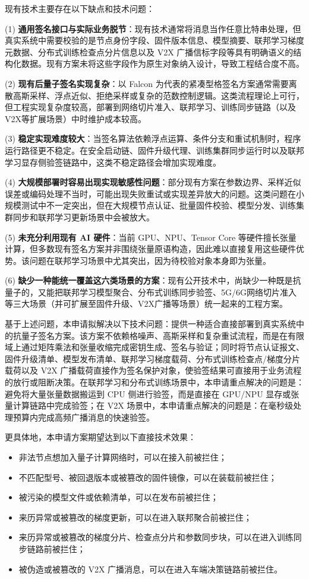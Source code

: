 \documentclass[12pt,a4paper]{article}
\begin{document}
现有技术主要存在以下缺点和技术问题：

(1) \textbf{通用签名接口与实际业务脱节}：现有技术通常将消息当作任意比特串处理，但真实系统中需要校验的是节点身份字段、固件版本信息、模型摘要、联邦学习梯度元数据、分布式训练检查点分片信息以及 V2X 广播信标字段等具有明确语义的结构化数据。现有方案未将这些字段作为原生对象纳入设计，导致工程结合度不高。

(2) \textbf{现有后量子签名实现复杂}：以 Falcon 为代表的紧凑型格签名方案通常需要离散高斯采样、浮点近似、拒绝采样或复杂的范数控制逻辑。这类流程理论上可行，但工程实现复杂度较高，部署到网络切片准入、联邦学习、训练同步链路（以及V2X等扩展场景）中时维护成本较高。

(3) \textbf{稳定实现难度较大}：当签名算法依赖浮点运算、条件分支和重试机制时，程序运行路径更不稳定。在安全启动链、固件升级代理、训练集群同步运行时以及联邦学习显存侧验签链路中，这类不稳定路径会增加实现难度。

(4) \textbf{大规模部署时容易出现实现敏感性问题}：部分现有方案在参数边界、采样近似误差或编码处理不当时，可能出现失败重试或实现差异放大的问题。这类问题在小规模测试中不一定突出，但在大规模节点认证、批量固件校验、模型分发、训练集群同步和联邦学习更新场景中会被放大。

(5) \textbf{未充分利用现有 AI 硬件}：当前 GPU、NPU、Tensor Core 等硬件擅长张量计算，但多数现有签名方案并非围绕张量原语构造，因此难以直接复用这些硬件优势。该问题在联邦学习场景中尤其突出，因为待校验对象本身即为张量。

(6) \textbf{缺少一种能统一覆盖这六类场景的方案}：现有公开技术中，尚缺少一种既是抗量子的，又能把联邦学习模型聚合、分布式训练同步验签、5G/6G网络切片准入等三大场景（并可扩展至固件升级、V2X广播等场景）统一起来的工程方案。

基于上述问题，本申请拟解决以下技术问题：提供一种适合直接部署到真实系统中的抗量子签名方案。该方案不依赖格噪声、高斯采样和复杂重试流程，而是在有限域上通过矩阵乘法和张量收缩完成密钥生成、签名与验证；同时将节点认证报文、固件升级清单、模型发布清单、联邦学习梯度载荷、分布式训练检查点/梯度分片载荷以及 V2X 广播载荷直接作为签名保护对象，使验签结果可直接用于业务流程的放行或阻断决策。在联邦学习和分布式训练场景中，本申请重点解决的问题是：避免将大量张量数据搬运到 CPU 侧进行验签，而是直接在 GPU/NPU 显存或张量计算链路中完成验签；在 V2X 场景中，本申请重点解决的问题是：在毫秒级处理预算内完成高频广播消息的快速验签。

更具体地，本申请方案期望达到以下直接技术效果：
\begin{itemize}
    \item 非法节点想加入量子计算网络时，可以在接入前被拦住；
    \item 不匹配型号、被回退版本或被篡改的固件镜像，可以在装载前被拦住；
    \item 被污染的模型文件或依赖清单，可以在发布前被拦住；
    \item 来历异常或被篡改的梯度更新，可以在进入联邦聚合前被拦住；
    \item 来历异常或被篡改的梯度分片、检查点分片和参数同步块，可以在进入训练同步链路前被拦住；
    \item 被伪造或被篡改的 V2X 广播消息，可以在进入车端决策链路前被拦住。
\end{itemize}
\end{document}
